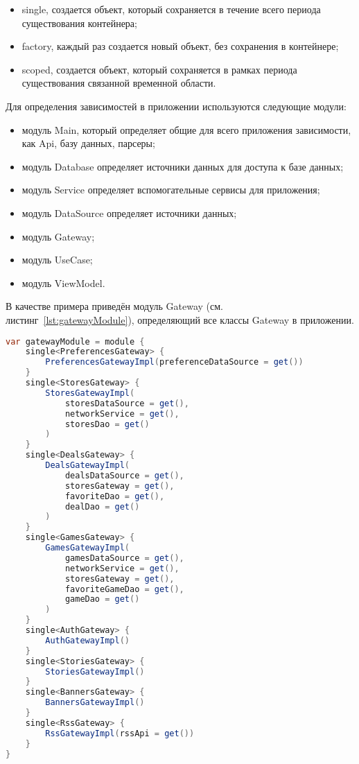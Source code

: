 \begin{itemize}
  \item single, создается объект, который сохраняется в течение всего периода существования контейнера;
  \item factory, каждый раз создается новый объект, без сохранения в контейнере;
  \item scoped, создается объект, который сохраняется в рамках периода существования связанной временной области.
\end{itemize}

Для определения зависимостей в приложении используются следующие модули:
\begin{itemize}
  \item модуль Main, который определяет общие для всего приложения зависимости, как Api, базу данных, парсеры;
  \item модуль Database определяет источники данных для доступа к базе данных;
  \item модуль Service определяет вспомогательные сервисы для приложения;
  \item модуль DataSource определяет источники данных;
  \item модуль Gateway;
  \item модуль UseCase;
  \item модуль ViewModel.
\end{itemize}


В качестве примера приведён модуль Gateway (см. листинг~\ref{lst:gatewayModule}), определяющий все классы Gateway в приложении.
\begin{lstlisting}[language=Java,label={lst:gatewayModule},caption={GatewayModule}]
var gatewayModule = module {
    single<PreferencesGateway> {
        PreferencesGatewayImpl(preferenceDataSource = get())
    }
    single<StoresGateway> {
        StoresGatewayImpl(
            storesDataSource = get(),
            networkService = get(),
            storesDao = get()
        )
    }
    single<DealsGateway> {
        DealsGatewayImpl(
            dealsDataSource = get(),
            storesGateway = get(),
            favoriteDao = get(),
            dealDao = get()
        )
    }
    single<GamesGateway> {
        GamesGatewayImpl(
            gamesDataSource = get(),
            networkService = get(),
            storesGateway = get(),
            favoriteGameDao = get(),
            gameDao = get()
        )
    }
    single<AuthGateway> {
        AuthGatewayImpl()
    }
    single<StoriesGateway> {
        StoriesGatewayImpl()
    }
    single<BannersGateway> {
        BannersGatewayImpl()
    }
    single<RssGateway> {
        RssGatewayImpl(rssApi = get())
    }
}
\end{lstlisting}


